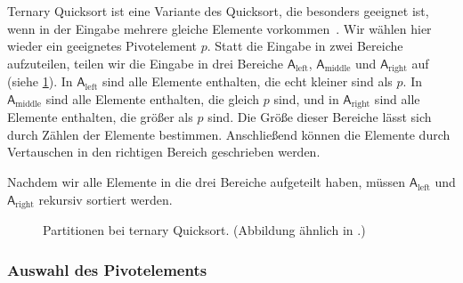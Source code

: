 \noindent
Ternary Quicksort ist eine Variante des Quicksort, die besonders geeignet ist,
wenn in der Eingabe mehrere gleiche Elemente vorkommen~\cite{ternary_quicksort}.
Wir wählen hier wieder ein geeignetes Pivotelement $p$.
Statt die Eingabe in zwei Bereiche aufzuteilen, teilen wir die Eingabe in drei Bereiche $\mathsf{A}_{\text{left}}$, $\mathsf{A}_{\text{middle}}$ und $\mathsf{A}_{\text{right}}$ auf (siehe \cref{fg:ternary_partitions}).
In $\mathsf{A}_{\text{left}}$ sind alle Elemente enthalten, die echt kleiner sind als $p$.
In $\mathsf{A}_{\text{middle}}$ sind alle Elemente enthalten, die gleich $p$ sind, und in $\mathsf{A}_{\text{right}}$ sind alle Elemente enthalten, die größer als $p$ sind.
Die Größe dieser Bereiche lässt sich durch Zählen der Elemente bestimmen.
Anschließend können die Elemente durch Vertauschen in den richtigen Bereich geschrieben werden.

Nachdem wir alle Elemente in die drei Bereiche aufgeteilt haben, müssen $\mathsf{A}_{\text{left}}$ und $\mathsf{A}_{\text{right}}$ rekursiv sortiert werden.

\begin{figure}[!h]
	\centering
	\caption[Partitionen bei ternary Quicksort]{Partitionen bei ternary Quicksort. (Abbildung ähnlich in \cite{ternary_quicksort}.)}
	\label{fg:ternary_partitions}
\end{figure}

\subsubsection{Auswahl des Pivotelements}

